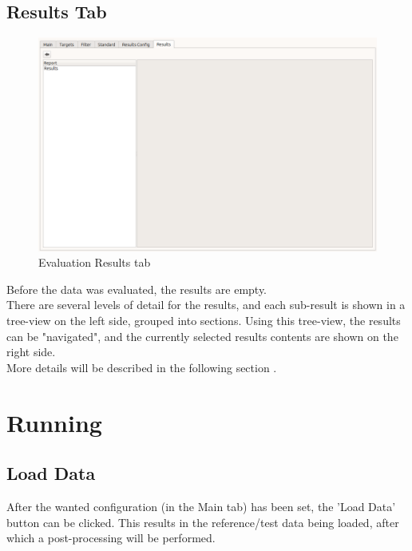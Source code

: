 \subsection{Results Tab}

\begin{figure}[H]
  \hspace*{-2cm}
    \includegraphics[width=18cm,frame]{figures/eval_results_empty.png}
  \caption{Evaluation Results tab}
\end{figure}

Before the data was evaluated, the results are empty.\\

There are several levels of detail for the results, and each sub-result is shown in a tree-view on the left side, grouped into sections. Using this tree-view, the results can be "navigated", and the currently selected results contents are shown on the right side. \\

More details will be described in the following section .

\section{Running}
\label{sec:eval_run} 

\subsection{Load Data}
\label{sec:eval_run_load} 

After the wanted configuration (in the Main tab) has been set, the 'Load Data' button can be clicked. This results in the reference/test data being loaded, after which a post-processing will be performed. \\

